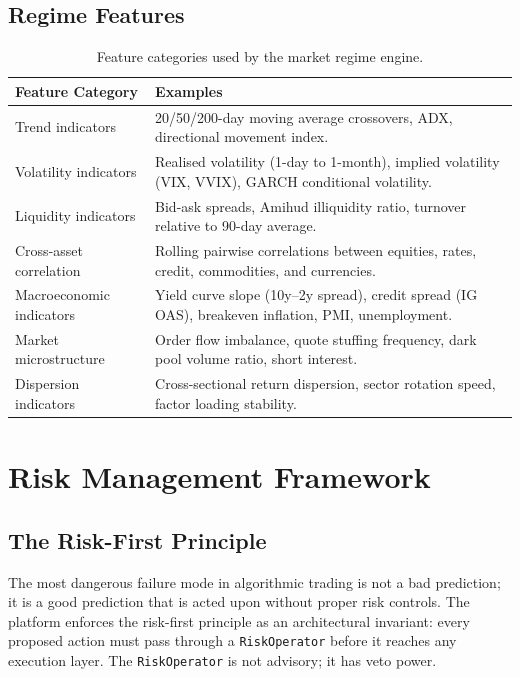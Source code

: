 \documentclass[12pt,openany]{book}
\numberwithin{equation}{chapter}
\theoremstyle{plain}
\theoremstyle{definition}
\theoremstyle{remark}
\begin{document}
\section{Regime Features}

\begin{table}[H]
\centering
\caption{Feature categories used by the market regime engine.}
\label{tab:regime_features}
\small
\begin{tabularx}{\textwidth}{p{4.2cm} p{10.3cm}}
\toprule
\textbf{Feature Category} & \textbf{Examples} \\
\midrule
Trend indicators & 20/50/200-day moving average crossovers, ADX,
    directional movement index. \\
\midrule
Volatility indicators & Realised volatility (1-day to 1-month),
    implied volatility (VIX, VVIX), GARCH conditional volatility. \\
\midrule
Liquidity indicators & Bid-ask spreads, Amihud illiquidity ratio,
    turnover relative to 90-day average. \\
\midrule
Cross-asset correlation & Rolling pairwise correlations between equities,
    rates, credit, commodities, and currencies. \\
\midrule
Macroeconomic indicators & Yield curve slope (10y--2y spread), credit
    spread (IG OAS), breakeven inflation, PMI, unemployment. \\
\midrule
Market microstructure & Order flow imbalance, quote stuffing frequency,
    dark pool volume ratio, short interest. \\
\midrule
Dispersion indicators & Cross-sectional return dispersion, sector
    rotation speed, factor loading stability. \\
\bottomrule
\end{tabularx}
\end{table}

\chapter{Risk Management Framework}

\section{The Risk-First Principle}

The most dangerous failure mode in algorithmic trading is not a bad
prediction; it is a good prediction that is acted upon without proper
risk controls. The platform enforces the risk-first principle as an
architectural invariant: every proposed action must pass through a
\texttt{RiskOperator} before it reaches any execution layer. The
\texttt{RiskOperator} is not advisory; it has veto power.
\end{document}
